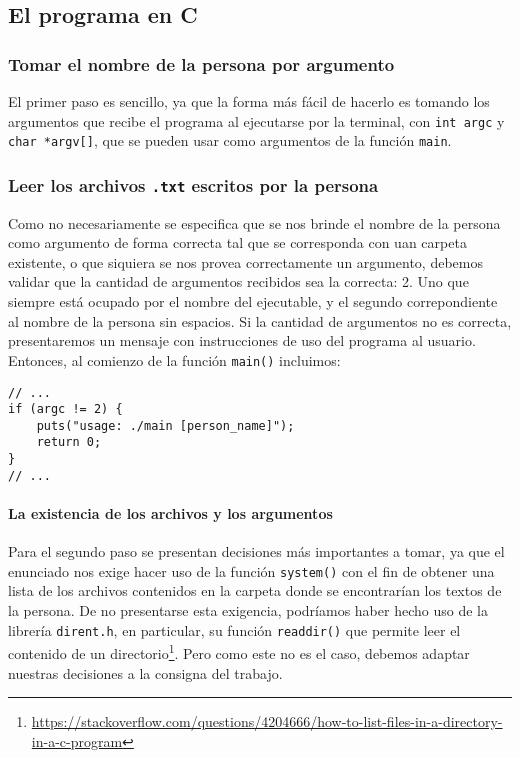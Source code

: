 \documentclass[a4paper]{article}
\begin{document}
\subsection{El programa en C}


\subsubsection{Tomar el nombre de la persona por argumento}

El primer paso es sencillo, ya que la forma más fácil de hacerlo es tomando los argumentos que recibe el programa al ejecutarse por la terminal, con \texttt{int argc} y \texttt{char *argv[]}, que se pueden usar como argumentos de la función \texttt{main}.

\subsubsection{Leer los archivos \texttt{.txt} escritos por la persona}

Como no necesariamente se especifica que se nos brinde el nombre de la persona como argumento de forma correcta tal que se corresponda con uan carpeta existente, o que siquiera se nos provea correctamente un argumento, debemos validar que la cantidad de argumentos recibidos sea la correcta: 2. Uno que siempre está ocupado por el nombre del ejecutable, y el segundo correpondiente al nombre de la persona sin espacios. Si la cantidad de argumentos no es correcta, presentaremos un mensaje con instrucciones de uso del programa al usuario. Entonces, al comienzo de la función \texttt{main()} incluimos:

\begin{verbatim}
// ...
if (argc != 2) {
    puts("usage: ./main [person_name]");
    return 0;
}
// ...
\end{verbatim}

\paragraph{La existencia de los archivos y los argumentos}

Para el segundo paso se presentan decisiones más importantes a tomar, ya que el enunciado nos exige hacer uso de la función \texttt{system()} con el fin de obtener una lista de los archivos contenidos en la carpeta donde se encontrarían los textos de la persona. De no presentarse esta exigencia, podríamos haber hecho uso de la librería \texttt{dirent.h}, en particular, su función \texttt{readdir()} que permite leer el contenido de un directorio\footnote{\url{https://stackoverflow.com/questions/4204666/how-to-list-files-in-a-directory-in-a-c-program}}. Pero como este no es el caso, debemos adaptar nuestras decisiones a la consigna del trabajo.
    
\end{document}
